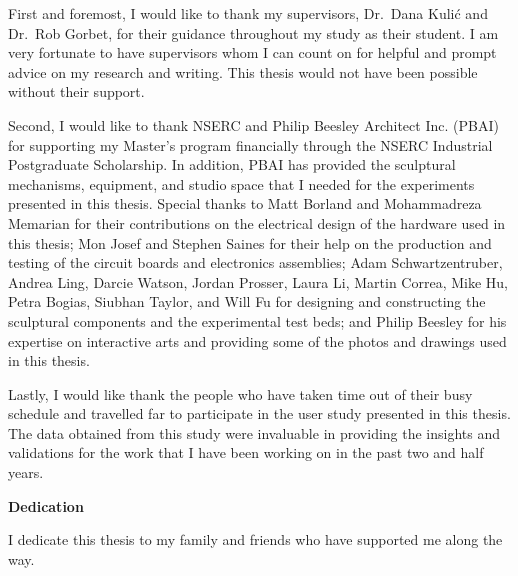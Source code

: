 First and foremost, I would like to thank my supervisors, Dr.~Dana Kuli\'{c} and Dr.~Rob Gorbet, for their guidance throughout my study as their student. I am very fortunate to have supervisors whom I can count on for helpful and prompt advice on my research and writing. This thesis would not have been possible without their support. 

Second, I would like to thank NSERC and Philip Beesley Architect Inc. (PBAI) for supporting my Master's program financially through the NSERC Industrial Postgraduate Scholarship. In addition, PBAI has provided the sculptural mechanisms, equipment, and studio space that I needed for the experiments presented in this thesis. Special thanks to Matt Borland and Mohammadreza Memarian for their contributions on the electrical design of the hardware used in this thesis; Mon Josef and Stephen Saines for their help on the production and testing of the circuit boards and electronics assemblies; Adam Schwartzentruber, Andrea Ling, Darcie Watson, Jordan Prosser, Laura Li, Martin Correa, Mike Hu, Petra Bogias, Siubhan Taylor, and Will Fu for designing and constructing the sculptural components and the experimental test beds; and Philip Beesley for his expertise on interactive arts and providing some of the photos and drawings used in this thesis. 

Lastly, I would like thank the people who have taken time out of their busy schedule and travelled far to participate in the user study presented in this thesis. The data obtained from this study were invaluable in providing the insights and validations for the work that I have been working on in the past two and half years. 





\cleardoublepage


\begin{center}\textbf{Dedication}\end{center}

I dedicate this thesis to my family and friends who have supported me along the way.

\cleardoublepage

\renewcommand\contentsname{Table of Contents}
\tableofcontents
\cleardoublepage
{}

\listoftables
\cleardoublepage
{}		%

